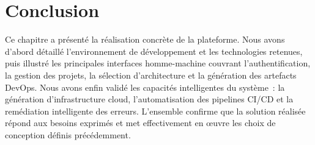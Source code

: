 \section{Conclusion}

Ce chapitre a présenté la réalisation concrète de la plateforme. Nous avons d'abord
détaillé l'environnement de développement et les technologies retenues, puis illustré les
principales interfaces homme-machine couvrant l'authentification, la gestion des projets,
la sélection d'architecture et la génération des artefacts DevOps. Nous avons enfin validé
les capacités intelligentes du système~: la génération d'infrastructure cloud,
l'automatisation des pipelines CI/CD et la remédiation intelligente des erreurs.
L'ensemble confirme que la solution réalisée répond aux besoins exprimés et met
effectivement en œuvre les choix de conception définis précédemment.
